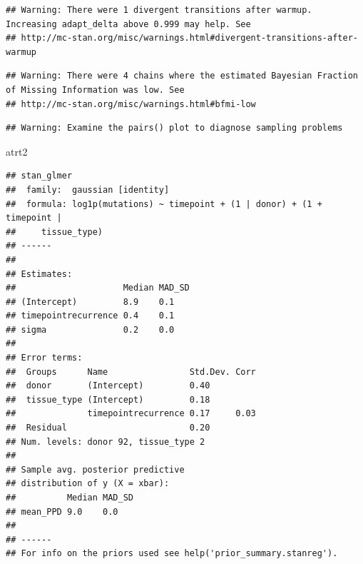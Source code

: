 \documentclass[]{article}
\newenvironment{Shaded}{\begin{snugshade}}{\end{snugshade}}
\newcommand{\KeywordTok}[1]{\textcolor[rgb]{0.13,0.29,0.53}{\textbf{{#1}}}}
\newcommand{\DataTypeTok}[1]{\textcolor[rgb]{0.13,0.29,0.53}{{#1}}}
\newcommand{\DecValTok}[1]{\textcolor[rgb]{0.00,0.00,0.81}{{#1}}}
\newcommand{\FloatTok}[1]{\textcolor[rgb]{0.00,0.00,0.81}{{#1}}}
\newcommand{\StringTok}[1]{\textcolor[rgb]{0.31,0.60,0.02}{{#1}}}
\newcommand{\NormalTok}[1]{{#1}}
\begin{document}
\begin{verbatim}
## Warning: There were 1 divergent transitions after warmup. Increasing adapt_delta above 0.999 may help. See
## http://mc-stan.org/misc/warnings.html#divergent-transitions-after-warmup
\end{verbatim}

\begin{verbatim}
## Warning: There were 4 chains where the estimated Bayesian Fraction of Missing Information was low. See
## http://mc-stan.org/misc/warnings.html#bfmi-low
\end{verbatim}

\begin{verbatim}
## Warning: Examine the pairs() plot to diagnose sampling problems
\end{verbatim}

\begin{Shaded}
\begin{Highlighting}[]
\NormalTok{atrt2}
\end{Highlighting}
\end{Shaded}

\begin{verbatim}
## stan_glmer
##  family:  gaussian [identity]
##  formula: log1p(mutations) ~ timepoint + (1 | donor) + (1 + timepoint | 
##     tissue_type)
## ------
## 
## Estimates:
##                     Median MAD_SD
## (Intercept)         8.9    0.1   
## timepointrecurrence 0.4    0.1   
## sigma               0.2    0.0   
## 
## Error terms:
##  Groups      Name                Std.Dev. Corr
##  donor       (Intercept)         0.40         
##  tissue_type (Intercept)         0.18         
##              timepointrecurrence 0.17     0.03
##  Residual                        0.20         
## Num. levels: donor 92, tissue_type 2 
## 
## Sample avg. posterior predictive 
## distribution of y (X = xbar):
##          Median MAD_SD
## mean_PPD 9.0    0.0   
## 
## ------
## For info on the priors used see help('prior_summary.stanreg').
\end{verbatim}

\begin{Shaded}
\end{Shaded}
\end{document}
